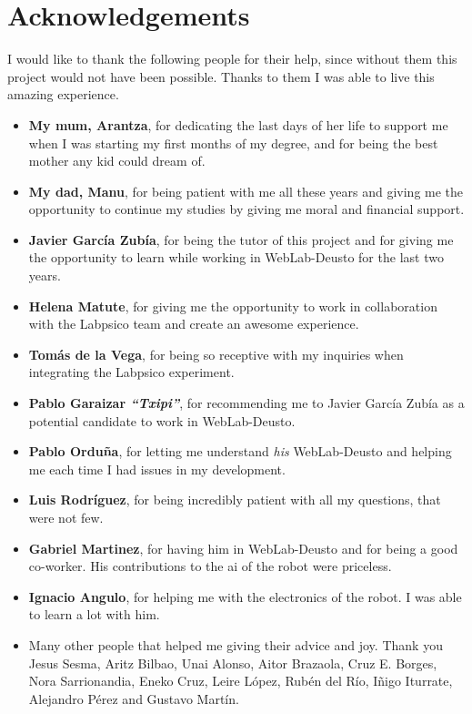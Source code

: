 \chapter*{Acknowledgements}

I would like to thank the following people for their help, since without them this project would not
have been possible. Thanks to them I was able to live this amazing experience.

\begin{itemize}
	\item \textbf{My mum, Arantza}, for dedicating the last days of her life to support me when I
	was starting my first months of my degree, and for being the best mother any kid could dream of.

	\item \textbf{My dad, Manu}, for being patient with me all these years and giving me the
	opportunity to continue my studies by giving me moral and financial support.

	\item \textbf{Javier García Zubía}, for being the tutor of this project and for giving me the
	opportunity to learn while working in WebLab-Deusto for the last two years.

	\item \textbf{Helena Matute}, for giving me the opportunity to work in collaboration with the
	Labpsico team and create an awesome experience.

	\item \textbf{Tomás de la Vega}, for being so receptive with my inquiries when integrating the
	Labpsico experiment.

	\item \textbf{Pablo Garaizar \emph{``Txipi''}}, for recommending me to Javier García Zubía as a
	potential candidate to work in WebLab-Deusto.

	\item \textbf{Pablo Orduña}, for letting me understand \emph{his} WebLab-Deusto and helping me
	each time I had issues in my development.

	\item \textbf{Luis Rodríguez}, for being incredibly patient with all my questions, that were not
	few.

	\item \textbf{Gabriel Martinez}, for having him in WebLab-Deusto and for being a good co-worker.
	His contributions to the \acrshort{ai} of the robot were priceless.

	\item \textbf{Ignacio Angulo}, for helping me with the electronics of the robot. I was able to
	learn a lot with him.

	\item Many other people that helped me giving their advice and joy. Thank you Jesus Sesma, Aritz
	Bilbao, Unai Alonso, Aitor Brazaola, Cruz E. Borges, Nora Sarrionandia, Eneko Cruz, Leire López,
	Rubén del Río, Iñigo Iturrate, Alejandro Pérez and Gustavo Martín.
\end{itemize}

